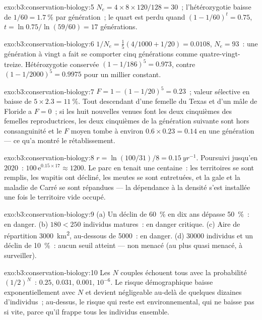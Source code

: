 \begin{solution}{exo:b3:conservation-biology:5}
$N_{e} = 4\times 8\times 120/128 = 30$~; l'hétérozygotie baisse de $1/60 =
\qty{1.7}{\%}$ par génération~; le quart est perdu quand $(1 - 1/60)^{t} =
0.75$, $t = \ln 0.75/\ln(59/60) = 17$ générations.
\end{solution}

\begin{solution}{exo:b3:conservation-biology:6}
$1/N_{e} = \tfrac{1}{5}(4/1000 + 1/20) = 0.0108$, $N_{e} = 93$~: une
génération à vingt a fait se comporter cinq générations comme
quatre-vingt-treize. Hétérozygotie conservée $(1 - 1/186)^{5} = 0.973$,
contre $(1 -
1/2000)^{5} = 0.9975$ pour un millier constant.
\end{solution}

\begin{solution}{exo:b3:conservation-biology:7}
$F = 1 - (1 - 1/20)^{5} = 0.23$~; valeur sélective en baisse de
$5\times 2.3 = \qty{11}{\%}$. Tout descendant d'une femelle du Texas et
d'un mâle de Floride a $F = 0$~; si les huit nouvelles venues font les
deux cinquièmes des femelles reproductrices, les deux cinquièmes de la
génération suivante sont hors consanguinité et le $F$ moyen tombe à
environ $0.6\times 0.23 = 0.14$ en une génération --- ce qu'a montré le
rétablissement.
\end{solution}

\begin{solution}{exo:b3:conservation-biology:8}
$r = \ln(100/31)/8 = \qty{0.15}{yr^{-1}}$. Poursuivi jusqu'en 2020~:
$100\,\mathrm{e}^{0.15\times 17} \approx 1200$. Le parc en tenait une
centaine~: les territoires se sont remplis, les wapitis ont décliné, les
meutes se sont entretuées, et la gale et la maladie de Carré se sont
répandues --- la dépendance à la densité s'est installée une fois le
territoire vide occupé.
\end{solution}

\begin{solution}{exo:b3:conservation-biology:9}
(a) Un déclin de \qty{60}{\%} en dix ans dépasse \qty{50}{\%}~: en
danger. (b) $180 < 250$ individus matures~: en danger critique. (c) Aire
de répartition \qty{3000}{km^2}, au-dessous de \qty{5000}{}~: en danger.
(d) \num{30000} individus et un déclin de \qty{10}{\%}~: aucun seuil
atteint --- non menacé (au plus quasi menacé, à surveiller).
\end{solution}

\begin{solution}{exo:b3:conservation-biology:10}
Les $N$ couples échouent tous avec la probabilité $(1/2)^{N}$~: $0.25$,
$0.031$, $0.001$, $10^{-6}$. Le risque démographique baisse
exponentiellement avec $N$ et devient négligeable au-delà de quelques
dizaines d'individus~; au-dessus, le risque qui reste est
environnemental, qui ne baisse pas si vite, parce qu'il frappe tous les
individus ensemble.
\end{solution}

